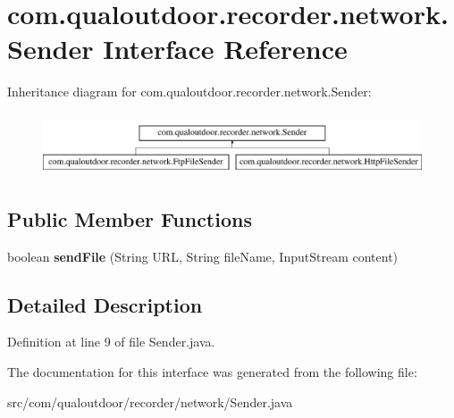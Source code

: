 \hypertarget{interfacecom_1_1qualoutdoor_1_1recorder_1_1network_1_1Sender}{\section{com.\-qualoutdoor.\-recorder.\-network.\-Sender Interface Reference}
\label{interfacecom_1_1qualoutdoor_1_1recorder_1_1network_1_1Sender}
}
Inheritance diagram for com.\-qualoutdoor.\-recorder.\-network.\-Sender\-:\begin{figure}[H]
\begin{center}
\leavevmode
\includegraphics[height=1.848185cm]{interfacecom_1_1qualoutdoor_1_1recorder_1_1network_1_1Sender}
\end{center}
\end{figure}
\subsection*{Public Member Functions}
\begin{DoxyCompactItemize}
\item 
\hypertarget{interfacecom_1_1qualoutdoor_1_1recorder_1_1network_1_1Sender_a24a5a5e2289d6d46b6173df62c137d90}{boolean {\bfseries send\-File} (String U\-R\-L, String file\-Name, Input\-Stream content)}\label{interfacecom_1_1qualoutdoor_1_1recorder_1_1network_1_1Sender_a24a5a5e2289d6d46b6173df62c137d90}

\end{DoxyCompactItemize}


\subsection{Detailed Description}


Definition at line 9 of file Sender.\-java.



The documentation for this interface was generated from the following file\-:\begin{DoxyCompactItemize}
\item 
src/com/qualoutdoor/recorder/network/Sender.\-java\end{DoxyCompactItemize}
